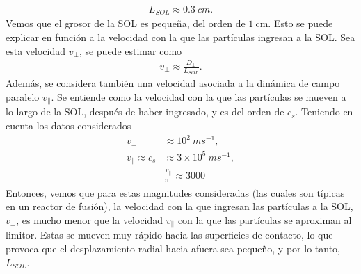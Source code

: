 \documentclass[../main.tex]{subfiles}
\begin{document}
    \begin{align}
        L_{SOL} \approx 0.3 \  cm.
    \end{align}
    Vemos que el grosor de la SOL es pequeña, del orden de $\mathrm{1 \ cm}$. Esto se puede explicar en función a la velocidad con la que las partículas ingresan a la SOL. Sea esta velocidad $v_\perp$, se puede estimar como \cite{stangeby2000plasma}
    \begin{align}
        v_{\perp} \approx \frac{D_{\perp}}{L_{SOL}}.
    \end{align}
    Además, se considera también una velocidad asociada a la dinámica de campo paralelo $v_\parallel$. Se entiende como la velocidad con la que las partículas se mueven a lo largo de la SOL, después de haber ingresado, y es del orden de $c_s$. Teniendo en cuenta los datos considerados
    \begin{align}
        v_{\perp} &\approx 10^2 \ ms^{-1}, \\
        v_{\parallel} \approx c_s &\approx 3\times10^5 \ ms^{-1}, \\
        &\frac{v_{\parallel}}{v_{\perp}}  \approx 3000
    \end{align}
    Entonces, vemos que para estas magnitudes consideradas (las cuales son típicas en un reactor de fusión), la velocidad con la que ingresan las partículas a la SOL, $v_\perp$, es mucho menor que la velocidad $v_\parallel$ con la que las partículas se aproximan al limitor. Estas se mueven muy rápido hacia las superficies de contacto, lo que provoca que el desplazamiento radial hacia afuera sea pequeño, y por lo tanto, $L_{SOL}$.
\end{document}
